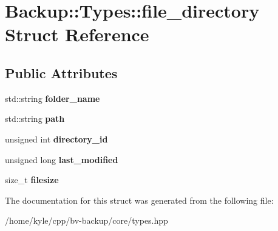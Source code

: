 \hypertarget{struct_backup_1_1_types_1_1file__directory}{}\section{Backup\+:\+:Types\+:\+:file\+\_\+directory Struct Reference}
\label{struct_backup_1_1_types_1_1file__directory}
\subsection*{Public Attributes}
\begin{DoxyCompactItemize}
\item 
\mbox{\label{struct_backup_1_1_types_1_1file__directory_a66d2b823b2c46ea4ed42fa1ec96460f9}} 
std\+::string {\bfseries folder\+\_\+name}
\item 
\mbox{\label{struct_backup_1_1_types_1_1file__directory_aa75499e15b9ebbc36af58b3315f80c50}} 
std\+::string {\bfseries path}
\item 
\mbox{\label{struct_backup_1_1_types_1_1file__directory_af79f387cdfbba92ecbda5fb217ad03ed}} 
unsigned int {\bfseries directory\+\_\+id}
\item 
\mbox{\label{struct_backup_1_1_types_1_1file__directory_aa9fb09bc59cbff23f1123a27e76385f1}} 
unsigned long {\bfseries last\+\_\+modified}
\item 
\mbox{\label{struct_backup_1_1_types_1_1file__directory_a1c2072b7d87f918bd6d72bc005e293f9}} 
size\+\_\+t {\bfseries filesize}
\end{DoxyCompactItemize}


The documentation for this struct was generated from the following file\+:\begin{DoxyCompactItemize}
\item 
/home/kyle/cpp/bv-\/backup/core/types.\+hpp\end{DoxyCompactItemize}
